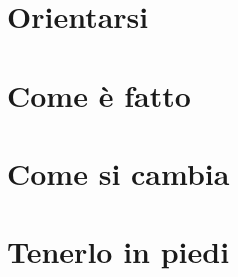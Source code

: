 \documentclass[11pt, a4paper, twoside, openany]{book}
\begin{document}
\frontmatter


\tableofcontents

\mainmatter

\part{Orientarsi}



\part{Come è fatto}



\part{Come si cambia}




\part{Tenerlo in piedi}



\backmatter
\printindex
\end{document}
